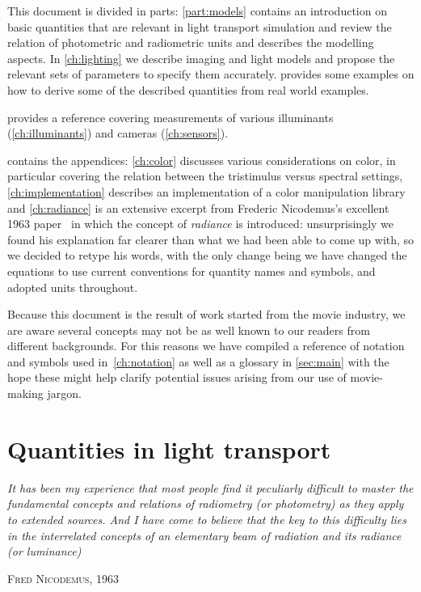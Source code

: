 This document is divided in parts: \cref{part:models}
contains an introduction on basic quantities that are relevant in
light transport simulation and review the relation of photometric and
radiometric units and describes the modelling aspects. In 
\cref{ch:lighting} we describe imaging and light models and propose the
relevant sets of parameters to specify them accurately.  
 provides some examples on how to derive some of
the described quantities from real world examples.

 provides a reference covering measurements of various 
illuminants (\cref{ch:illuminants}) and cameras (\cref{ch:sensors}).

 contains the appendices: \cref{ch:color} discusses
various considerations on color, in particular covering the relation between 
the tristimulus versus spectral settings,
\cref{ch:implementation} describes an implementation of a color manipulation library
and \cref{ch:radiance} is an extensive excerpt from Frederic Nicodemus's 
excellent 1963 paper~\cite{nicodemus63} in which the concept of \textsl{\gls{radiance}}
is introduced: unsurprisingly we found his explanation far clearer than what we 
had been able to come up with, so we decided to retype his words, with the only change being
we have changed the equations to use current conventions for quantity names and symbols, 
and adopted  units throughout.

Because this document is the result of work started from the movie industry, 
we are aware several concepts may not be as well known to our readers from different backgrounds. 
For this reasons we have compiled a reference of notation and symbols used in~\cref{ch:notation} 
as well as a glossary in \cref{sec:main} with the hope these might help clarify potential issues arising 
from our use of movie-making jargon.

\section{Quantities in light transport}
\epigraph{%
	\emph{It has been	my experience that most people find it peculiarly difficult to master 
	the fundamental concepts and relations of radiometry (or photometry) as they apply 
	to extended sources. And I have come to believe that the key to this difficulty 
	lies in the interrelated concepts of an elementary beam of radiation and its 
	radiance (or luminance)}}{\textsc{Fred Nicodemus}, 1963}

